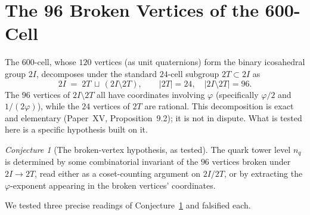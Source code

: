 \documentclass[11pt,a4paper]{article}
\theoremstyle{definition}\newtheorem{definition}[theorem]{Definition}
\theoremstyle{remark}
\newtheorem{conjecture}[theorem]{Conjecture}
\theoremstyle{definition}\newtheorem{construction}[theorem]{Construction}
\newcommand{\vp}{\varphi}
\newcommand{\twoI}{2I}
\newcommand{\twoT}{2T}
\begin{document}
\section{The 96 Broken Vertices of the 600-Cell}
\label{P16:sec:vertices}

The $600$-cell, whose $120$ vertices (as unit quaternions) form the
binary icosahedral group $\twoI$, decomposes under the standard
$24$-cell subgroup $\twoT\subset\twoI$ as
\begin{equation}
  \twoI \;=\; \twoT \,\sqcup\, (\twoI\setminus\twoT),
  \qquad |\twoT|=24,\quad |\twoI\setminus\twoT|=96.
  \label{P16:eq:vertex_decomp}
\end{equation}
The $96$ vertices of $\twoI\setminus\twoT$ all have coordinates
involving $\vp$ (specifically $\vp/2$ and $1/(2\vp)$), while the $24$
vertices of $\twoT$ are rational. This decomposition is exact and
elementary (Paper~XV, Proposition~9.2); it is not in dispute. What
is tested here is a specific hypothesis built on it.

\begin{conjecture}[The broken-vertex hypothesis, as tested]
\label{P16:conj:vertices}
The quark tower level $n_q$ is determined by some combinatorial
invariant of the $96$ vertices broken under $\twoI\to\twoT$, read
either as a coset-counting argument on $\twoI/\twoT$, or by
extracting the $\vp$-exponent appearing in the broken vertices'
coordinates.
\end{conjecture}

We tested three precise readings of Conjecture~\ref{P16:conj:vertices} and
falsified each.
\end{document}
